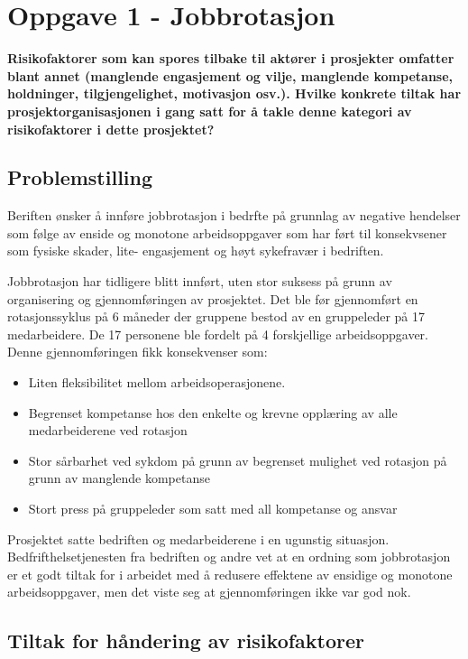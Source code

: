 \section{Oppgave 1 - Jobbrotasjon}

	{\bf Risikofaktorer som kan spores tilbake til aktører i prosjekter omfatter blant 
	annet (manglende engasjement og vilje, manglende kompetanse, holdninger, tilgjengelighet,
	motivasjon osv.). Hvilke konkrete tiltak har prosjektorganisasjonen i gang satt for å
	takle denne kategori av risikofaktorer i dette prosjektet?}

	\subsection*{Problemstilling}
		Beriften ønsker å innføre jobbrotasjon i bedrfte på grunnlag av negative hendelser som følge
		av enside og monotone arbeidsoppgaver som har ført til konsekvsener som fysiske skader, lite-
		engasjement og høyt sykefravær i bedriften. 

		Jobbrotasjon har tidligere blitt innført, uten stor suksess på grunn av organisering
		og gjennomføringen av prosjektet. Det ble før gjennomført en rotasjonssyklus på 6 måneder
		der gruppene bestod av en gruppeleder på 17 medarbeidere. De 17 personene ble fordelt på 
		4 forskjellige arbeidsoppgaver. Denne gjennomføringen fikk konsekvenser som:
			\begin{itemize}
				\item Liten fleksibilitet mellom arbeidsoperasjonene.
				\item Begrenset kompetanse hos den enkelte og krevne opplæring av 
				alle medarbeiderene ved rotasjon
				\item Stor sårbarhet ved sykdom på grunn av begrenset mulighet ved 
				rotasjon på grunn av manglende kompetanse
				\item Stort press på gruppeleder som satt med all kompetanse og ansvar
			\end{itemize}
		Prosjektet satte bedriften og medarbeiderene i en ugunstig situasjon. 
		Bedfrifthelsetjenesten fra bedriften og andre vet at en ordning som jobbrotasjon 
		er et godt tiltak for i arbeidet med å redusere effektene av ensidige og monotone arbeidsoppgaver,
		men det viste seg at gjennomføringen ikke var god nok. 

	\clearpage
	\subsection*{Tiltak for håndering av risikofaktorer}


